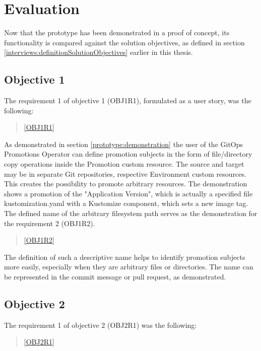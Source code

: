 \section{Evaluation}
\label{prototype:evaluation}

Now that the prototype has been demonstrated in a proof of concept,
its functionality is compared against the solution objectives,
as defined in section
\ref{interviews:definitionSolutionObjectives}
earlier in this thesis.

\subsection*{Objective 1}

The requirement 1 of objective 1 (OBJ1R1), formulated as a user story,
was the following:

\begin{quotation}
	\noindent
	\ref{OBJ1R1}
\end{quotation}

As demonstrated in section
\ref{prototype:demonstration}
the user of the GitOps Promotions Operator can define promotion subjects
in the form of file/directory copy operations inside the Promotion custom resource.
The source and target may be in separate Git repositories, respective Environment custom resources.
This creates the possibility to promote arbitrary resources.
The demonstration shows a promotion of the "Application Version",
which is actually a specified file kustomization.yaml with a Kustomize component,
which sets a new image tag.
The defined name of the arbitrary filesystem path serves as the demonstration for the requirement 2 (OBJ1R2).

\begin{quotation}
	\noindent
	\ref{OBJ1R2}
\end{quotation}

The definition of such a descriptive name helps to identify promotion subjects more easily, especially when
they are arbitrary files or directories. The name can be represented in the commit message or pull request, as demonstrated.

\subsection*{Objective 2}

The requirement 1 of objective 2 (OBJ2R1) was the following:

\begin{quotation}
	\noindent
	\ref{OBJ2R1}
\end{quotation}

